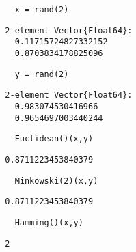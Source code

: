 \begin{tcolorbox}[width=\textwidth, left=-6mm, sharp corners, boxrule=0pt]
  \begin{verbatim}
    x = rand(2) 
  \end{verbatim}
\end{tcolorbox}
\footnotesize
\vspace{-4mm} %
\begin{verbatim}
  2-element Vector{Float64}:
    0.11715724827332152
    0.8703834178825096
\end{verbatim}

\begin{tcolorbox}[width=\textwidth, left=-6mm, sharp corners, boxrule=0pt]
  \begin{verbatim}
    y = rand(2)
  \end{verbatim}
\end{tcolorbox}
\footnotesize
\vspace{-4mm}
\begin{verbatim}
  2-element Vector{Float64}:
    0.983074530416966
    0.9654697003440244
\end{verbatim}

\begin{tcolorbox}[width=\textwidth, left=-6mm, sharp corners, boxrule=0pt]
  \begin{verbatim}
    Euclidean()(x,y)
  \end{verbatim}
\end{tcolorbox}
\footnotesize
\vspace{-4mm}
\begin{verbatim}
  0.8711223453840379
\end{verbatim}

\begin{tcolorbox}[width=\textwidth, left=-6mm, sharp corners, boxrule=0pt]
  \begin{verbatim}
    Minkowski(2)(x,y)
  \end{verbatim}
\end{tcolorbox}
\footnotesize
\vspace{-4mm}
\begin{verbatim}
  0.8711223453840379
\end{verbatim}

\begin{tcolorbox}[width=\textwidth, left=-6mm, sharp corners, boxrule=0pt]
  \begin{verbatim}
    Hamming()(x,y)
  \end{verbatim}
\end{tcolorbox}
\footnotesize
\vspace{-4mm}
\begin{verbatim}
  2
\end{verbatim}

